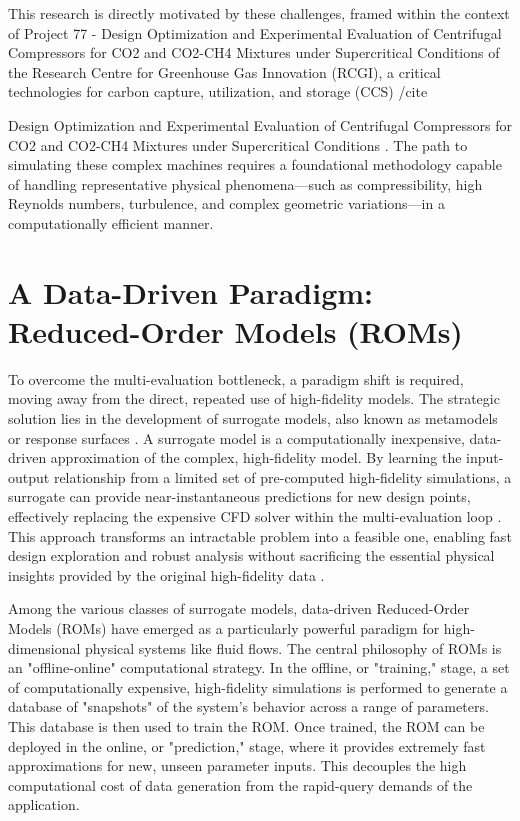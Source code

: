 \documentclass[dsc, EN]{ufabcFHZh}
\begin{document}
This research is directly motivated by these challenges, framed within the context of Project 77 - Design Optimization and Experimental Evaluation of Centrifugal Compressors for CO2 and CO2-CH4 Mixtures under Supercritical Conditions of the Research Centre for Greenhouse Gas Innovation (RCGI), a critical technologies for carbon capture, utilization, and storage (CCS) /cite{Design Optimization and Experimental Evaluation of Centrifugal Compressors for CO2 and CO2-CH4 Mixtures under Supercritical Conditions \citep{RCGI_Project77}. The path to simulating these complex machines requires a foundational methodology capable of handling representative physical phenomena—such as compressibility, high Reynolds numbers, turbulence, and complex geometric variations—in a computationally efficient manner.

\section{A Data-Driven Paradigm: Reduced-Order Models (ROMs)}

To overcome the multi-evaluation bottleneck, a paradigm shift is required, moving away from the direct, repeated use of high-fidelity models. The strategic solution lies in the development of surrogate models, also known as metamodels or response surfaces \citep{Hu2020}. A surrogate model is a computationally inexpensive, data-driven approximation of the complex, high-fidelity model. By learning the input-output relationship from a limited set of pre-computed high-fidelity simulations, a surrogate can provide near-instantaneous predictions for new design points, effectively replacing the expensive CFD solver within the multi-evaluation loop \citep{Yondo2018, EspinosaBarcenas2023}. This approach transforms an intractable problem into a feasible one, enabling fast design exploration and robust analysis without sacrificing the essential physical insights provided by the original high-fidelity data \citep{Hu2020}.

Among the various classes of surrogate models, data-driven Reduced-Order Models (ROMs) have emerged as a particularly powerful paradigm for high-dimensional physical systems like fluid flows. The central philosophy of ROMs is an "offline-online" computational strategy. In the offline, or "training," stage, a set of computationally expensive, high-fidelity simulations is performed to generate a database of "snapshots" of the system's behavior across a range of parameters. This database is then used to train the ROM. Once trained, the ROM can be deployed in the online, or "prediction," stage, where it provides extremely fast approximations for new, unseen parameter inputs. This decouples the high computational cost of data generation from the rapid-query demands of the application.

}
\end{document}
